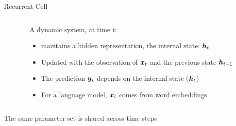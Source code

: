 \begin{frame}{Recurrent Cell}
  \begin{columns}
    \begin{column}{0.5\textwidth}
    \end{column}
    \begin{column}{0.5\textwidth}
      A dynamic system, at time $t$:
      \begin{itemize}
      \item maintains a hidden representation, the internal state:  $\boldsymbol{h}_t$
      \item Updated with the observation of $\boldsymbol{x}_t$  and the previous state $\boldsymbol{h}_{t-1}$
      \item The prediction $\boldsymbol{y}_t$ depends on the internal state ($\boldsymbol{h}_t$)
      \item For a language model, $\boldsymbol{x}_t$ comes from word embeddings
      \end{itemize}
    \end{column}
  \end{columns}
  \begin{center}\vfill
    The same parameter set is shared across time steps
  \end{center}
\end{frame}


